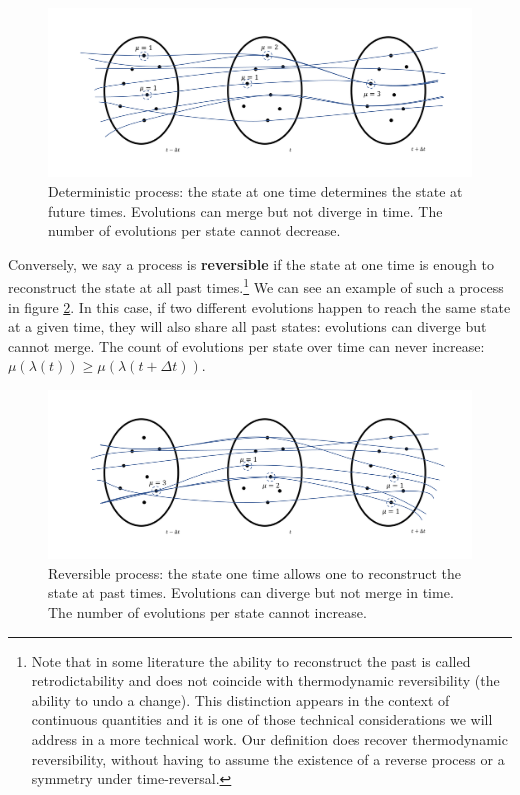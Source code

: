 \documentclass[letterpaper,twocolumn]{article}
\begin{document}
\begin{figure}[h!]
	\includegraphics[width=\columnwidth]{images/Slide3.png}
	\caption{Deterministic process: the state at one time determines the state at future times. Evolutions can merge but not diverge in time. The number of evolutions per state cannot decrease.}\label{fig_determinism}
\end{figure}

Conversely, we say a process is \textbf{reversible} if the state at one time is enough to reconstruct the state at all past times.\footnote{Note that in some literature the ability to reconstruct the past is called retrodictability and does not coincide with thermodynamic reversibility (the ability to undo a change). This distinction appears in the context of continuous quantities and it is one of those technical considerations we will address in a more technical work. Our definition does recover thermodynamic reversibility, without having to assume the existence of a reverse process or a symmetry under time-reversal.} We can see an example of such a process in figure \ref{fig_reversibility}. In this case, if two different evolutions happen to reach the same state at a given time, they will also share all past states: evolutions can diverge but cannot merge. The count of evolutions per state over time can never increase: $
\mu(\lambda(t)) \geq \mu(\lambda(t + \Delta t))$.

\begin{figure}[h!]
	\includegraphics[width=\columnwidth]{images/Slide4.png}
	\caption{Reversible process: the state one time allows one to reconstruct the state at past times. Evolutions can diverge but not merge in time. The number of evolutions per state cannot increase.}\label{fig_reversibility}
\end{figure}
\end{document}
